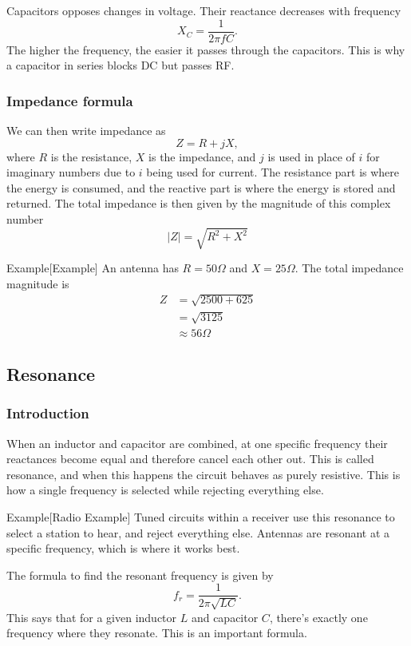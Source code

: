 \documentclass{article}
\begin{document}
Capacitors opposes changes in voltage. Their reactance decreases with frequency
\[
    X_C=\frac{1}{2\pi fC}.
\]
The higher the frequency, the easier it passes through the capacitors. This is why a capacitor in series blocks DC but passes RF.

\subsubsection{Impedance formula}
We can then write impedance as
\[
    Z=R+jX,
\]
where $R$ is the resistance, $X$ is the impedance, and $j$ is used in place of $i$ for imaginary numbers due to $i$ being used for current. The resistance part is where the energy is consumed, and the reactive part is where the energy is stored and returned.
The total impedance is then given by the magnitude of this complex number
\[
    |Z|=\sqrt{R^2+X^2}
\]

\begin{callout}{Example}[Example]
    An antenna has $R=50\Omega $ and $X=25\Omega $. The total impedance magnitude is
    \begin{align*}
        Z &= \sqrt{2500+625} \\
          &=\sqrt{3125} \\
          &\approx 56\Omega 
    \end{align*}
\end{callout}

\subsection{Resonance}
\subsubsection{Introduction}
When an inductor and capacitor are combined, at one specific frequency their reactances become equal and therefore cancel each other out. This is called resonance, and when this happens the circuit behaves as purely resistive. This is how a single frequency is selected while rejecting everything else.
\begin{callout}{Example}[Radio Example]
    Tuned circuits within a receiver use this resonance to select a station to hear, and reject everything else. Antennas are resonant at a specific frequency, which is where it works best.
\end{callout}

The formula to find the resonant frequency is given by
\[
    f_r=\frac{1}{2\pi \sqrt{LC}}.
\]
This says that for a given inductor $L$ and capacitor $C$, there's exactly one frequency where they resonate. This is an important formula.
\end{document}
